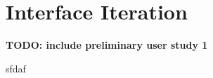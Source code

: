 \section{Interface Iteration}\label{interface-iteration}

\textbf{TODO: include preliminary user study 1}

sfdaf
